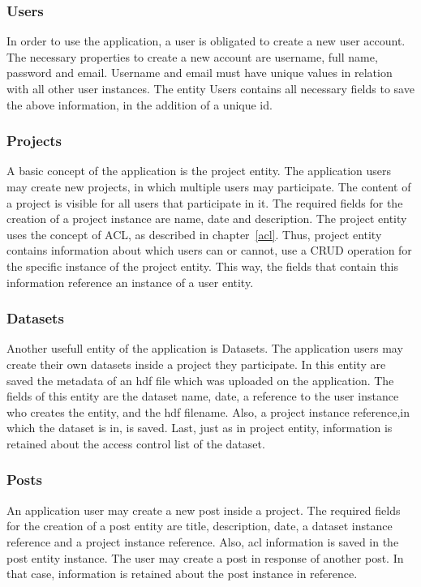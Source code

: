 	 
\subsubsection{Users}
In order to use the application, a user is obligated to create a new user account. The necessary properties to create a new account are username, full name, password and email. Username and email must have unique values in relation with all other user instances. The entity Users contains all necessary fields to save the above information, in the addition of a unique id.
\subsubsection{Projects}
A basic concept of the application is the project entity. The application users may create new projects, in which multiple users may participate. The content of a project is visible for all users that participate in it. The required fields for the creation of a project instance are name, date and description. The project entity uses the concept of ACL, as described in chapter~\ref{acl}. Thus, project entity contains information about which users can or cannot, use a CRUD operation for the specific instance of the project entity. This way, the fields that contain this information reference an instance of a user entity.
\subsubsection{Datasets}
Another usefull entity of the application is Datasets. The application users may create their own datasets inside a project they participate. In this entity are saved the metadata of an hdf file which was uploaded on the application. The fields of this entity are the dataset name, date, a reference to the user instance who creates the entity, and the hdf filename. Also, a project instance reference,in which the dataset is in, is saved. Last, just as in project entity, information is retained about the access control list of the dataset.
\subsubsection{Posts}
An application user may create a new post inside a project. The required fields for the creation of a post entity are title, description, date, a dataset instance reference and a project instance reference. Also, acl information  is saved in the post entity instance. The user may create a post in response of another post. In that case, information is retained about the post instance in reference.
